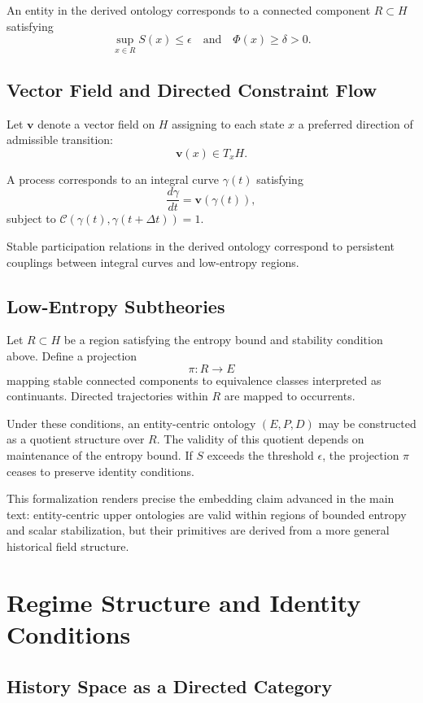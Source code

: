 \documentclass[12pt]{article}
\begin{document}
An entity in the derived ontology corresponds to a connected component $R \subset H$ satisfying
\[
\sup_{x \in R} S(x) \leq \epsilon
\quad \text{and} \quad
\Phi(x) \geq \delta > 0.
\]

\subsection{Vector Field and Directed Constraint Flow}

Let $\mathbf{v}$ denote a vector field on $H$ assigning to each state $x$ a preferred direction of admissible transition:
\[
\mathbf{v}(x) \in T_x H.
\]

A process corresponds to an integral curve $\gamma(t)$ satisfying
\[
\frac{d\gamma}{dt} = \mathbf{v}(\gamma(t)),
\]
subject to $\mathcal{C}(\gamma(t), \gamma(t+\Delta t)) = 1$.

Stable participation relations in the derived ontology correspond to persistent couplings between integral curves and low-entropy regions.

\subsection{Low-Entropy Subtheories}

Let $R \subset H$ be a region satisfying the entropy bound and stability condition above. Define a projection
\[
\pi : R \to E
\]
mapping stable connected components to equivalence classes interpreted as continuants. Directed trajectories within $R$ are mapped to occurrents.

Under these conditions, an entity-centric ontology $(E, P, D)$ may be constructed as a quotient structure over $R$. The validity of this quotient depends on maintenance of the entropy bound. If $S$ exceeds the threshold $\epsilon$, the projection $\pi$ ceases to preserve identity conditions.

This formalization renders precise the embedding claim advanced in the main text: entity-centric upper ontologies are valid within regions of bounded entropy and scalar stabilization, but their primitives are derived from a more general historical field structure.

\section{Regime Structure and Identity Conditions}

\subsection{History Space as a Directed Category}
\end{document}
